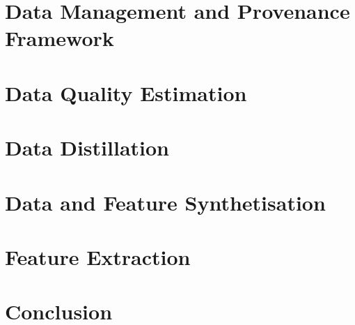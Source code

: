 \documentclass{manolo}
\begin{document}
\clearpage
\section{Data Management and Provenance Framework}
\label{sec:datmgmt}


\clearpage
\section{Data Quality Estimation}
\label{sec:datqual}


\clearpage
\section{Data Distillation}
\label{sec:datdist}


\clearpage
\section{Data and Feature Synthetisation}
\label{sec:datsynth}


\clearpage
\section{Feature Extraction}
\label{sec:featextr}


\clearpage
\section{Conclusion}



\end{document}
